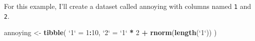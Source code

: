 \documentclass[]{book}
\newenvironment{Shaded}{\begin{snugshade}}{\end{snugshade}}
\newcommand{\DataTypeTok}[1]{\textcolor[rgb]{0.13,0.29,0.53}{#1}}
\newcommand{\DecValTok}[1]{\textcolor[rgb]{0.00,0.00,0.81}{#1}}
\newcommand{\KeywordTok}[1]{\textcolor[rgb]{0.13,0.29,0.53}{\textbf{#1}}}
\newcommand{\NormalTok}[1]{#1}
\newcommand{\OperatorTok}[1]{\textcolor[rgb]{0.81,0.36,0.00}{\textbf{#1}}}
\newcommand{\StringTok}[1]{\textcolor[rgb]{0.31,0.60,0.02}{#1}}
\theoremstyle{plain}
\theoremstyle{remark}
\begin{document}
For this example, I'll create a dataset called annoying with
columns named \texttt{1} and \texttt{2}.

\begin{Shaded}
\begin{Highlighting}[]
\NormalTok{annoying <-}\StringTok{ }\KeywordTok{tibble}\NormalTok{(}
  \StringTok{`}\DataTypeTok{1}\StringTok{`}\NormalTok{ =}\StringTok{ }\DecValTok{1}\OperatorTok{:}\DecValTok{10}\NormalTok{,}
  \StringTok{`}\DataTypeTok{2}\StringTok{`}\NormalTok{ =}\StringTok{ `}\DataTypeTok{1}\StringTok{`} \OperatorTok{*}\StringTok{ }\DecValTok{2} \OperatorTok{+}\StringTok{ }\KeywordTok{rnorm}\NormalTok{(}\KeywordTok{length}\NormalTok{(}\StringTok{`}\DataTypeTok{1}\StringTok{`}\NormalTok{))}
\NormalTok{)}
\end{Highlighting}
\end{Shaded}
\end{document}
